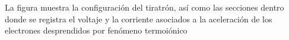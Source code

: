 La figura \ut{\ref{fig:circuit}} muestra la configuración del tiratrón, así como las secciones dentro donde se registra el voltaje y la corriente asociados a la aceleración de los electrones desprendidos por fenómeno termoiónico 